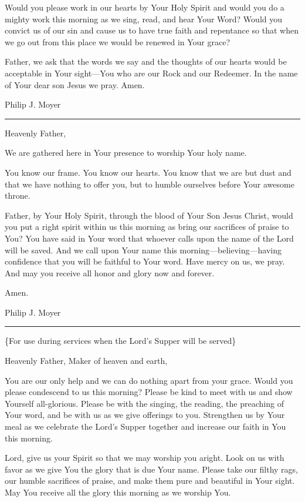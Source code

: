 \documentclass[]{book}
\begin{document}
Would you please work in our hearts by Your Holy Spirit and would you do a mighty work this morning as we sing, read, and hear Your Word? Would you convict us of our sin and cause us to have true faith and repentance so that when we go out from this place we would be renewed in Your grace?

Father, we ask that the words we say and the thoughts of our hearts would be acceptable in Your sight---You who are our Rock and our Redeemer. In the name of Your dear son Jesus we pray. Amen.

Philip J. Moyer

\begin{center}\rule{0.5\linewidth}{\linethickness}\end{center}

Heavenly Father,

We are gathered here in Your presence to worship Your holy name.

You know our frame. You know our hearts. You know that we are but dust and that we have nothing to offer you, but to humble ourselves before Your awesome throne.

Father, by Your Holy Spirit, through the blood of Your Son Jesus Christ, would you put a right spirit within us this morning as bring our sacrifices of praise to You? You have said in Your word that whoever calls upon the name of the Lord will be saved. And we call upon Your name this morning---believing---having confidence that you will be faithful to Your word. Have mercy on us, we pray. And may you receive all honor and glory now and forever.

Amen.

Philip J. Moyer

\begin{center}\rule{0.5\linewidth}{\linethickness}\end{center}

\{For use during services when the Lord's Supper will be served\}

Heavenly Father, Maker of heaven and earth,

You are our only help and we can do nothing apart from your grace. Would you please condescend to us this morning? Please be kind to meet with us and show Yourself all-glorious. Please be with the singing, the reading, the preaching of Your word, and be with us as we give offerings to you. Strengthen us by Your meal as we celebrate the Lord's Supper together and increase our faith in You this morning.

Lord, give us your Spirit so that we may worship you aright. Look on us with favor as we give You the glory that is due Your name. Please take our filthy rags, our humble sacrifices of praise, and make them pure and beautiful in Your sight. May You receive all the glory this morning as we worship You.
\end{document}
